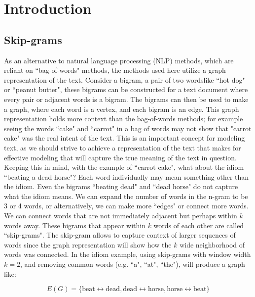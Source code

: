 %
%
%

\section{Introduction}


\subsection{ Skip-grams}
\hspace*{0.5cm} As an alternative to natural language processing (NLP) methods, which are reliant on ``bag-of-words" methods, the methods used here utilize a graph representation of the text. Consider a bigram, a pair of two words\textemdash like ``hot dog" or ``peanut butter", these bigrams can be constructed for a text document where every pair or adjacent words is a bigram. The bigrams can then be used to make a graph, where each word is a vertex, and each bigram is an edge. This graph representation holds more context than the bag-of-words methods; for example seeing the words ``cake" and ``carrot" in a bag of words may not show that "carrot cake" was the real intent of the text. This is an important concept for modeling text, as we should strive to achieve a representation of the text that makes for effective modeling that will capture the true meaning of the text in question. Keeping this in mind, with the example of ``carrot cake", what about the idiom ``beating a dead horse"? Each word individually may mean something other than the idiom. Even the bigrams ``beating dead" and ``dead horse" do not capture what the idiom means. We can expand the number of words in the n-gram to be 3 or 4 words, or alternatively, we can make more ``edges" or connect more words. We can connect words that are not immediately adjacent but perhaps within $k$ words away. These bigrams that appear within $k$ words of each other are called ``skip-grams". The skip-gram allows to capture context of larger sequences of words since the graph representation will show how the $k$ wide neighborhood of words was connected. In the idiom example, using skip-grams with window width $k = 2$, and removing common words (e.g. ``a", ``at", ``the"), will produce a graph like: 

$$
E(G) = \{
\text{beat}  \longleftrightarrow \text{dead}, 
\text{dead}  \longleftrightarrow \text{horse}, 
\text{horse}  \longleftrightarrow \text{beat} \}
$$

